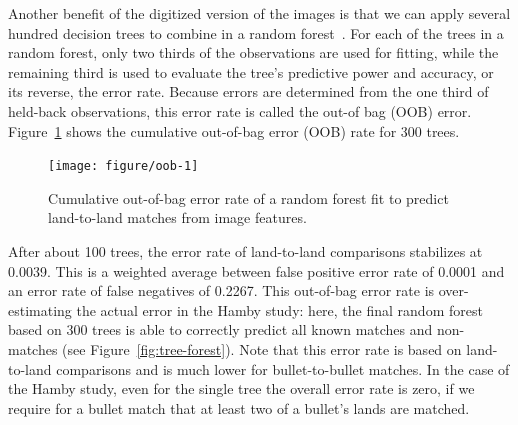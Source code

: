 \documentclass[aoas, preprint]{imsart}\usepackage[]{graphicx}\usepackage[]{color}
\newenvironment{knitrout}{}{} %
\begin{document}
Another benefit of the digitized version of the images is that we can apply several hundred decision trees to combine in a random forest~\citep{breiman:2001, randomForest}.  For each of the trees in a random forest, only two thirds of the observations are used for fitting, while  the remaining third is used to evaluate the tree's predictive power and accuracy, or its reverse, the error rate. Because errors are determined from the one third of held-back observations, this error rate is called the out-of bag (OOB) error. 
Figure~\ref{fig:oob} shows the cumulative out-of-bag error (OOB) rate for 300 trees. 
%
\begin{figure}[hbtp]
  \centering
\begin{knitrout}
\color{fgcolor}
\texttt{[image: figure/oob-1]} 

\end{knitrout}
\caption{\label{fig:oob}Cumulative out-of-bag error rate of a random forest fit to predict land-to-land matches from image features.}
\end{figure}
%
After about 100 trees, the error rate of land-to-land comparisons stabilizes at 0.0039. This is a weighted average between false positive error rate of 0.0001 and an error rate of false negatives of 0.2267. This out-of-bag error rate is over-estimating the actual error in the Hamby study: here, the final random forest based on 300 trees is able to correctly predict all known  matches and non-matches (see Figure~\ref{fig:tree-forest}).
Note that this error rate is based on land-to-land comparisons and is much lower for bullet-to-bullet matches. In the case of the Hamby study, even for the single tree the overall error rate is zero, if we require for a bullet match that at least two of a bullet's lands are matched. %
\end{document}
